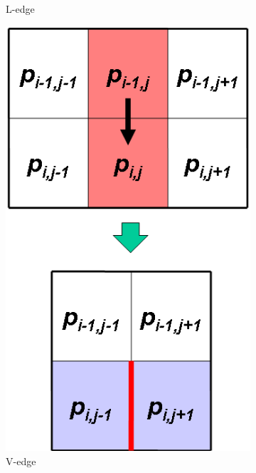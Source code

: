 \documentclass[final]{cvpr}
\begin{document}
\begin{figure}[htb]
\begin{center}
\begin{subfigure}[b]{0.30\linewidth}
    \caption{L-edge}
\end{subfigure}
\begin{subfigure}[b]{0.30\linewidth}
    \includegraphics[width=\textwidth]{edge1.png}
    \caption{V-edge}
\end{subfigure}
\begin{subfigure}[b]{0.30\linewidth}

\end{subfigure}
\end{center}
\end{figure}
\end{document}
